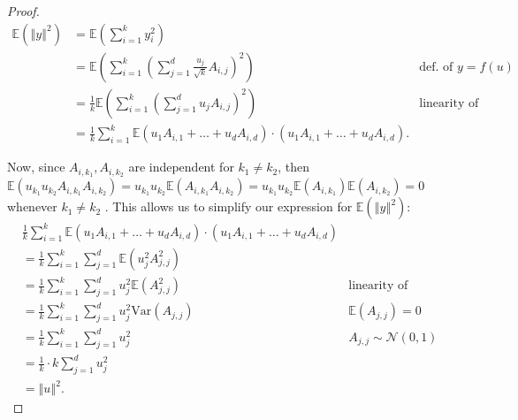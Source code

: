 \documentclass{article}
\begin{document}
     \begin{proof}
     \begin{align*}
         \mathbb{E}(\left\Vert y \right\Vert^2) &= \mathbb{E} \left(\sum_{i=1}^k y_i^2\right)\\
         &= \mathbb{E} \left(\sum_{i=1}^k \left( \sum_{j=1}^d \frac{u_j}{\sqrt{k}}A_{i,j} \right)^2\right) &\text{def. of $y = f(u)$}\\
         &= \frac{1}{k} \mathbb{E} \left(\sum_{i=1}^k \left( \sum_{j=1}^d u_j A_{i,j} \right)^2\right) &\text{linearity of expectation}\\
         &= \frac{1}{k} \sum_{i=1}^k \mathbb{E} (u_1A_{i,1} + \ldots + u_dA_{i,d}) \cdot (u_1A_{i,1} + \ldots + u_dA_{i,d}).
     \end{align*}
     
     Now, since $A_{i,k_1}, A_{i,k_2}$ are independent for $k_1 \neq k_2$, then $\mathbb{E}(u_{k_1}u_{k_2}A_{i,k_1}A_{i,k_2}) = u_{k_1}u_{k_2} \mathbb{E}(A_{i,k_1}A_{i,k_2}) = u_{k_1}u_{k_2} \mathbb{E}(A_{i,k_1})\mathbb{E}(A_{i,k_2}) = 0$ whenever $k_1 \neq k_2$ \cite{pollard_2001}. This allows us to simplify our expression for $\mathbb{E}(\left\Vert y \right\Vert^2)$:
     \begin{align*}
         &\frac{1}{k} \sum_{i=1}^k \mathbb{E} (u_1A_{i,1} + \ldots + u_dA_{i,d}) \cdot (u_1A_{i,1} + \ldots + u_dA_{i,d})\\
         &= \frac{1}{k} \sum_{i=1}^k \sum_{j=1}^d \mathbb{E}(u_j^2 A_{j,j}^2)\\
         &= \frac{1}{k} \sum_{i=1}^k \sum_{j=1}^d u_j^2 \mathbb{E}(A_{j,j}^2) &\text{linearity of expectation}\\
         &= \frac{1}{k} \sum_{i=1}^k \sum_{j=1}^d u_j^2 \text{Var}(A_{j,j}) & \mathbb{E}(A_{j,j}) = 0\\
         &= \frac{1}{k} \sum_{i=1}^k \sum_{j=1}^d u_j^2 &A_{j,j} \sim \mathcal{N}(0,1)\\
         &= \frac{1}{k} \cdot k \sum_{j=1}^d u_j^2\\
         &= \left\Vert u \right\Vert^2.
     \end{align*}
     \end{proof}
\end{document}

